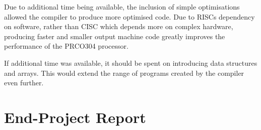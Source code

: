 \documentclass[11pt,a4paper]{report}
\newcommand{\scname}{PRCO304}
\begin{document}
Due to additional time being available, the inclusion of simple optimisations allowed the compiler to produce more optimised code. Due to RISCs dependency on software, rather than CISC which depends more on complex hardware, producing faster and smaller output machine code greatly improves the performance of the \scname{} processor.

If additional time was available, it should be spent on introducing data structures and arrays. This would extend the range of programs created by the compiler even further.

\chapter{End-Project Report}
{\hypersetup{linkcolor=black}
\startcontents[chapters]
}
\end{document}
